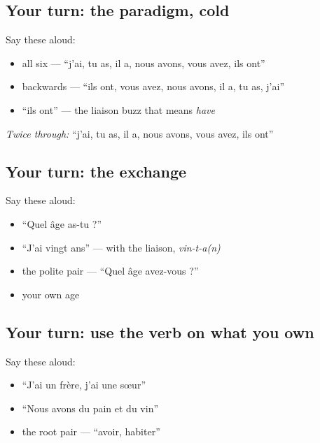 \subsection*{Your turn: the paradigm, cold}
Say these aloud:

\begin{itemize}
\raggedright
  \item all six — \textquotedblleft{}j'ai, tu as, il a, nous avons, vous avez, ils ont\textquotedblright{}
  \item backwards — \textquotedblleft{}ils ont, vous avez, nous avons, il a, tu as, j'ai\textquotedblright{}
  \item \textquotedblleft{}ils ont\textquotedblright{} — the liaison buzz that means \emph{have}
\end{itemize}

\emph{Twice through:} \textquotedblleft{}j'ai, tu as, il a, nous avons, vous avez, ils ont\textquotedblright{}

\subsection*{Your turn: the exchange}
Say these aloud:

\begin{itemize}
\raggedright
  \item \textquotedblleft{}Quel âge as-tu ?\textquotedblright{}
  \item \textquotedblleft{}J'ai vingt ans\textquotedblright{} — with the liaison, \emph{vin-t-a(n)}
  \item the polite pair — \textquotedblleft{}Quel âge avez-vous ?\textquotedblright{}
  \item your own age
\end{itemize}

\subsection*{Your turn: use the verb on what you own}
Say these aloud:

\begin{itemize}
\raggedright
  \item \textquotedblleft{}J'ai un frère, j'ai une sœur\textquotedblright{}
  \item \textquotedblleft{}Nous avons du pain et du vin\textquotedblright{}
  \item the root pair — \textquotedblleft{}avoir, habiter\textquotedblright{}
\end{itemize}

